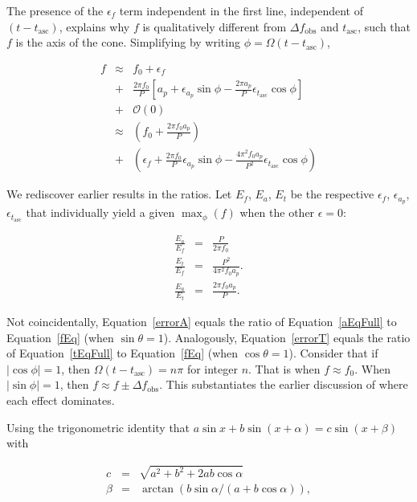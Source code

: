\documentclass{article}
\begin{document}
The presence of the $\epsilon_f$ term independent in the first line, independent of $(t-t_\mathrm{asc})$, explains why $f$ is qualitatively different from $\Delta f_\mathrm{obs}$ and $t_\mathrm{asc}$, such that $f$ is the axis of the cone.
Simplifying by writing $\phi = \Omega (t- t_\mathrm{asc})$,

\begin{eqnarray}
f &\approx& f_0 + \epsilon_f \nonumber \\
                   &+&\frac{2 \pi f_0}{P}\left[
                     a_p
                   + \epsilon_{a_p} \sin \phi
                   - \frac{2 \pi  a_p}{P} \epsilon_{t_\mathrm{asc}} \cos \phi \right] \nonumber \\
                   &+& \mathcal{O}(0)\\
  &\approx& \left(f_0 + \frac{2\pi f_0 a_p}{P} \right) \nonumber \\
  &+& \left(\epsilon_f + \frac{2 \pi f_0}{P} \epsilon_{a_p} \sin\phi - \frac{4 \pi^2 f_0 a_p}{P^2} \epsilon_{t_\mathrm{asc}} \cos\phi\right)
\label{niceApprox}
\end{eqnarray}

We rediscover earlier results in the ratios.
Let $E_f$, $E_a$, $E_t$ be the respective $\epsilon_f$, $\epsilon_{a_p}$, $\epsilon_{t_\mathrm{asc}}$ that individually yield a given $\max_\phi (f)$ when the other $\epsilon =0$:

\begin{eqnarray}
\frac{E_a }{ E_f }  &=& \frac{P }{2 \pi f_0} \label{errorA}\\
\frac{E_t }{ E_f }  &=& \frac{P^2}{4 \pi^2 f_0 a_p}.\label{errorT}\\
\frac{E_a}{E_t} &=& \frac{2 \pi f_0 a_p}{P}.\label{errorAT}
\end{eqnarray}

\noindent Not coincidentally, Equation~\ref{errorA} equals the ratio of Equation~\ref{aEqFull} to Equation~\ref{fEq} (when $\sin \theta = 1$).
Analogously, Equation~\ref{errorT} equals the ratio of Equation~\ref{tEqFull} to Equation~\ref{fEq} (when $\cos \theta = 1$).
Consider that if $|\cos \phi| = 1$, then $\Omega (t-t_\mathrm{asc}) = n \pi$ for integer $n$.
That is when $f \approx f_0$.
When $|\sin \phi| = 1$, then $f \approx f \pm \Delta f_\mathrm{obs}$.
This substantiates the earlier discussion of where each effect dominates.

Using the trigonometric identity that $a \sin x + b\sin (x+\alpha) = c\sin(x + \beta)$ with 

\begin{eqnarray}
c &=& \sqrt{a^2 + b^2 + 2 a b \cos \alpha}\\
\beta  &=& \arctan(b \sin \alpha / (a + b \cos \alpha)),
\end{eqnarray}
\end{document}
